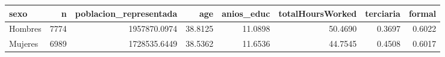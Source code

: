 \begin{tabular}{lrrrrrrr}
\toprule
sexo & n & poblacion\_representada & age & anios\_educ & totalHoursWorked & terciaria & formal \\
\midrule
Hombres & 7774 & 1957870.0974 & 38.8125 & 11.0898 & 50.4690 & 0.3697 & 0.6022 \\
Mujeres & 6989 & 1728535.6449 & 38.5362 & 11.6536 & 44.7545 & 0.4508 & 0.6017 \\
\bottomrule
\end{tabular}
